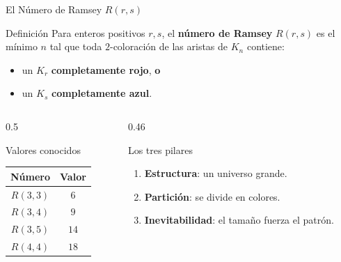 \begin{frame}{El Número de Ramsey $R(r,s)$}

    \begin{alertblock}{Definición}
        Para enteros positivos $r,s$, el \textbf{número de Ramsey}
        $R(r,s)$ es el mínimo $n$ tal que toda $2$-coloración de
        las aristas de $K_n$ contiene:
        \begin{itemize}
            \item un $K_r$ \textbf{completamente rojo}, \textbf{o}
            \item un $K_s$ \textbf{completamente azul}.
        \end{itemize}
    \end{alertblock}

    \pause
    \vspace{0.3cm}

    \begin{columns}[T]
        \begin{column}{0.5\textwidth}
            \begin{block}{Valores conocidos}
                \begin{center}
                \begin{tabular}{cc}
                    \hline
                    Número & Valor \\
                    \hline
                    $R(3,3)$ & $6$ \\
                    $R(3,4)$ & $9$ \\
                    $R(3,5)$ & $14$ \\
                    $R(4,4)$ & $18$ \\
                    \hline
                \end{tabular}
                \end{center}
            \end{block}
        \end{column}
        \begin{column}{0.46\textwidth}
            \begin{exampleblock}{Los tres pilares}
                \begin{enumerate}
                    \item \textbf{Estructura}: un universo grande.
                    \item \textbf{Partición}: se divide en colores.
                    \item \textbf{Inevitabilidad}: el tamaño fuerza el patrón.
                \end{enumerate}
            \end{exampleblock}
        \end{column}
    \end{columns}

\end{frame}